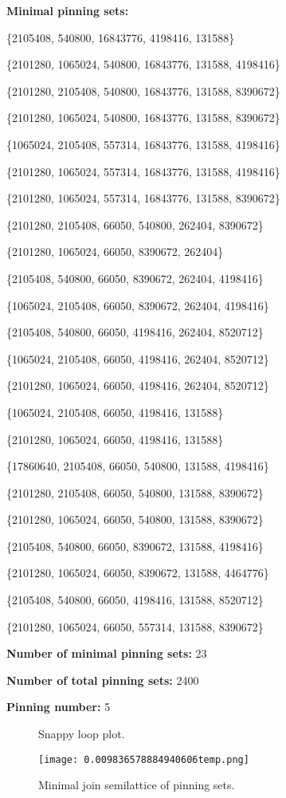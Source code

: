 \documentclass{article}%
\begin{document}
\begin{multicols}{2}
\textbf{Minimal pinning sets:}

\{{2105408, 540800, 16843776, 4198416, 131588}\}

\{{2101280, 1065024, 540800, 16843776, 131588, 4198416}\}

\{{2101280, 2105408, 540800, 16843776, 131588, 8390672}\}

\{{2101280, 1065024, 540800, 16843776, 131588, 8390672}\}

\{{1065024, 2105408, 557314, 16843776, 131588, 4198416}\}

\{{2101280, 1065024, 557314, 16843776, 131588, 4198416}\}

\{{2101280, 1065024, 557314, 16843776, 131588, 8390672}\}

\{{2101280, 2105408, 66050, 540800, 262404, 8390672}\}

\{{2101280, 1065024, 66050, 8390672, 262404}\}

\{{2105408, 540800, 66050, 8390672, 262404, 4198416}\}

\{{1065024, 2105408, 66050, 8390672, 262404, 4198416}\}

\{{2105408, 540800, 66050, 4198416, 262404, 8520712}\}

\{{1065024, 2105408, 66050, 4198416, 262404, 8520712}\}

\{{2101280, 1065024, 66050, 4198416, 262404, 8520712}\}

\{{1065024, 2105408, 66050, 4198416, 131588}\}

\{{2101280, 1065024, 66050, 4198416, 131588}\}

\{{17860640, 2105408, 66050, 540800, 131588, 4198416}\}

\{{2101280, 2105408, 66050, 540800, 131588, 8390672}\}

\{{2101280, 1065024, 66050, 540800, 131588, 8390672}\}

\{{2105408, 540800, 66050, 8390672, 131588, 4198416}\}

\{{2101280, 1065024, 66050, 8390672, 131588, 4464776}\}

\{{2105408, 540800, 66050, 4198416, 131588, 8520712}\}

\{{2101280, 1065024, 66050, 557314, 131588, 8390672}\}



\textbf{Number of minimal pinning sets:} 23

\textbf{Number of total pinning sets:} 2400

\textbf{Pinning number:} 5


\end{multicols}

\begin{multicols}{2}
\begin{figure}[H]
\centering

\caption{Snappy loop plot.}
\label{fig:0.8508977158324097temp.svg}
\end{figure}\columnbreak

\begin{figure}[H]
\centering
\texttt{[image: 0.009836578884940606temp.png]}
\caption{Minimal join semilattice of pinning sets.}
\label{fig:0.009836578884940606temp.png}
\end{figure}\end{multicols}\newpage
\end{document}
